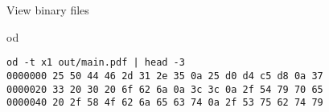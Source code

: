 \begin{frame}[fragile]{View binary files}
  \begin{exampleblock}{od}
    \begin{lstlisting}[showstringspaces=false,basicstyle=\tiny]
od -t x1 out/main.pdf | head -3
0000000 25 50 44 46 2d 31 2e 35 0a 25 d0 d4 c5 d8 0a 37
0000020 33 20 30 20 6f 62 6a 0a 3c 3c 0a 2f 54 79 70 65
0000040 20 2f 58 4f 62 6a 65 63 74 0a 2f 53 75 62 74 79
    \end{lstlisting}
  \end{exampleblock}
\end{frame}

